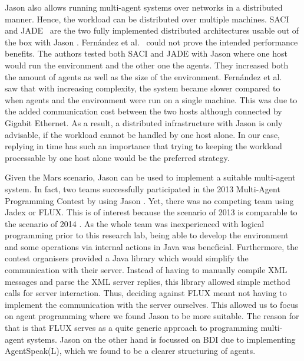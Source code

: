 Jason also allows running multi-agent systems over networks in a distributed manner. Hence, the workload can be distributed over multiple machines. SACI~\cite{hubner_saci_2000} and JADE~\cite{bellifemine_jade_2005} are the two fully implemented distributed architectures usable out of the box with Jason \cite{bordini_programming_2007}. Fernández et al.~\cite{fernandez_evaluating_2010} could not prove the intended performance benefits. The authors tested both SACI and JADE with Jason where one host would run the environment and the other one the agents. They increased both the amount of agents as well as the size of the environment. Fernández et al.~\cite{fernandez_evaluating_2010} saw that with increasing complexity, the system became slower compared to when agents and the environment were run on a single machine. This was due to the added communication cost between the two hosts although connected by Gigabit Ethernet. As a result, a distributed infrastructure with Jason is only advisable, if the workload cannot be handled by one host alone. In our case, replying in time has such an importance that trying to keeping the workload processable by one host alone would be the preferred strategy.

Given the Mars scenario, Jason can be used to implement a suitable multi-agent system. In fact, two teams successfully participated in the 2013 Multi-Agent Programming Contest by using Jason \cite{ahlbrecht_multi_2013}. %
Yet, there was no competing team using Jadex or FLUX.
This is of interest because the scenario of 2013 is comparable to the scenario of 2014 \cite{ahlbrecht_mapc_2014}. %
As the whole team was inexperienced with logical programming prior to this research lab, being able to develop the environment and some operations via internal actions in Java was beneficial. Furthermore, the contest organisers provided a Java library which would simplify the communication with their server. Instead of having to manually compile XML messages and parse the XML server replies, this library allowed simple method calls for server interaction. Thus, deciding against FLUX meant not having to implement the communication with the server ourselves. This allowed us to focus on agent programming where we found Jason to be more suitable. The reason for that is that FLUX serves as a quite generic approach to programming multi-agent systems. Jason on the other hand is focussed on BDI due to implementing AgentSpeak(L), which we found to be a clearer structuring of agents.
